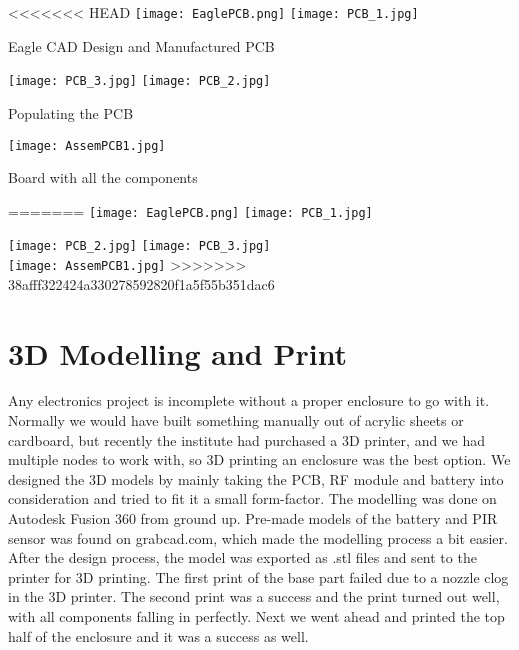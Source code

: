 \begin{center}
<<<<<<< HEAD
		\texttt{[image: EaglePCB.png]}		
		\hspace{10pt}
		\texttt{[image: PCB\_1.jpg]}
		
		Eagle CAD Design and Manufactured PCB
		
		\texttt{[image: PCB\_3.jpg]}		
		\texttt{[image: PCB\_2.jpg]}		
		
		Populating the PCB
		
		\vspace{20pt}
		\texttt{[image: AssemPCB1.jpg]}
		
		Board with all the components
		
		
=======
	\texttt{[image: EaglePCB.png]}
	\texttt{[image: PCB\_1.jpg]}
	
	\texttt{[image: PCB\_2.jpg]}
	\texttt{[image: PCB\_3.jpg]}
	\\
	\vspace{10pt}
	\texttt{[image: AssemPCB1.jpg]}
>>>>>>> 38afff322424a330278592820f1a5f55b351dac6
\end{center}

\section{3D Modelling and Print}
Any electronics project is incomplete without a proper enclosure to go with it. Normally we would have built something manually out of acrylic sheets or cardboard, but recently the institute had purchased a 3D printer, and we had multiple nodes to work with, so 3D printing an enclosure was the best option. 
We designed the 3D models by mainly taking the PCB, RF module and battery into consideration and tried to fit it a small form-factor. The modelling was done on Autodesk Fusion 360 from ground up. Pre-made models of the battery and PIR sensor was found on grabcad.com, which made the modelling process a bit easier.
After the design process, the model was exported as .stl files and sent to the printer for 3D printing. The first print of the base part failed due to a nozzle clog in the 3D printer. The second print was a success and the print turned out well, with all components falling in perfectly. Next we went ahead and printed the top half of the enclosure and it was a success as well.

